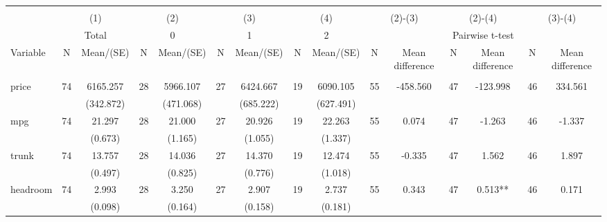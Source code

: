 
\begin{tabular}{@{\extracolsep{5pt}}lcccccccccccccc}
\\[-1.8ex]\hline \hline \\[-1.8ex]
 & \multicolumn{2}{c}{(1)}  & \multicolumn{2}{c}{(2)}  & \multicolumn{2}{c}{(3)}  & \multicolumn{2}{c}{(4)}  & \multicolumn{2}{c}{(2)-(3)} & \multicolumn{2}{c}{(2)-(4)} & \multicolumn{2}{c}{(3)-(4)} \\
 & \multicolumn{2}{c}{Total}  & \multicolumn{2}{c}{0}  & \multicolumn{2}{c}{1}  & \multicolumn{2}{c}{2}  & \multicolumn{6}{c}{Pairwise t-test}  \\
Variable & N & Mean/(SE) & N & Mean/(SE) & N & Mean/(SE) & N & Mean/(SE) & N & Mean difference & N & Mean difference & N & Mean difference \\ \hline \\[-1.8ex] 
price   & 74    & 6165.257    & 28    & 5966.107    & 27    & 6424.667    & 19    & 6090.105    & 55    & -458.560    & 47    & -123.998    & 46    & 334.561   \\
 &   & (342.872)  &   & (471.068)  &   & (685.222)  &   & (627.491)  &   &  &   &  &   &  \\ [1ex]
mpg   & 74    & 21.297    & 28    & 21.000    & 27    & 20.926    & 19    & 22.263    & 55    & 0.074    & 47    & -1.263    & 46    & -1.337   \\
 &   & (0.673)  &   & (1.165)  &   & (1.055)  &   & (1.337)  &   &  &   &  &   &  \\ [1ex]
trunk   & 74    & 13.757    & 28    & 14.036    & 27    & 14.370    & 19    & 12.474    & 55    & -0.335    & 47    & 1.562    & 46    & 1.897   \\
 &   & (0.497)  &   & (0.825)  &   & (0.776)  &   & (1.018)  &   &  &   &  &   &  \\ [1ex]
headroom   & 74    & 2.993    & 28    & 3.250    & 27    & 2.907    & 19    & 2.737    & 55    & 0.343    & 47    & 0.513**    & 46    & 0.171   \\
 &   & (0.098)  &   & (0.164)  &   & (0.158)  &   & (0.181)  &   &  &   &  &   &  \\ [1ex]

\end{tabular}
